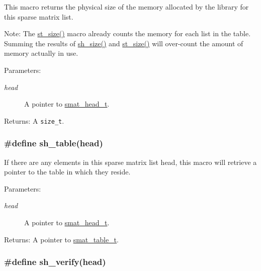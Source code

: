 This macro returns the physical size of the memory allocated by the library for this sparse matrix list.

\begin{Desc}
\item[Note:]The \hyperlink{group__dbprim__smat_a27}{st\_\-size()} macro already counts the memory for each list in the table. Summing the results of \hyperlink{group__dbprim__smat_a37}{sh\_\-size()} and \hyperlink{group__dbprim__smat_a27}{st\_\-size()} will over-count the amount of memory actually in use.\end{Desc}
\begin{Desc}
\item[Parameters:]
\begin{description}
\item[{\em head}]A pointer to \hyperlink{group__dbprim__smat_a1}{smat\_\-head\_\-t}.\end{description}
\end{Desc}
\begin{Desc}
\item[Returns:]A {\tt size\_\-t}. \end{Desc}
\hypertarget{group__dbprim__smat_a31}{
\subsubsection[sh\_\-table]{\setlength{\rightskip}{0pt plus 5cm}\#define sh\_\-table(head)}}
\label{group__dbprim__smat_a31}


If there are any elements in this sparse matrix list head, this macro will retrieve a pointer to the table in which they reside.

\begin{Desc}
\item[Parameters:]
\begin{description}
\item[{\em head}]A pointer to \hyperlink{group__dbprim__smat_a1}{smat\_\-head\_\-t}.\end{description}
\end{Desc}
\begin{Desc}
\item[Returns:]A pointer to \hyperlink{group__dbprim__smat_a0}{smat\_\-table\_\-t}. \end{Desc}
\hypertarget{group__dbprim__smat_a29}{
\subsubsection[sh\_\-verify]{\setlength{\rightskip}{0pt plus 5cm}\#define sh\_\-verify(head)}}
\label{group__dbprim__smat_a29}


